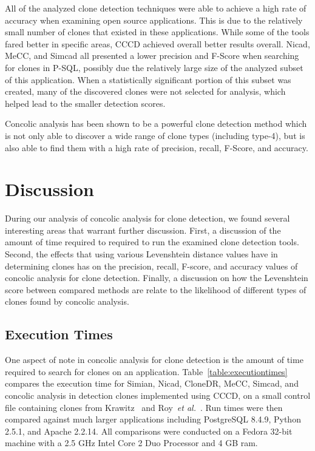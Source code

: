 \documentclass[smallextended]{svjour3}       %
\begin{document}
All of the analyzed clone detection techniques were able to achieve a high rate of accuracy when examining open source applications. This is due to the relatively small number of clones that existed in these applications. While some of the tools fared better in specific areas, CCCD achieved overall better results overall. Nicad, MeCC, and Simcad all presented a lower precision and F-Score when searching for clones in P-SQL, possibly due the relatively large size of the analyzed subset of this application. When a statistically significant portion of this subset was created, many of the discovered clones were not selected for analysis, which helped lead to the smaller detection scores.


Concolic analysis has been shown to be a powerful clone detection method which is not only able to discover a wide range of clone types (including type-4), but is also able to find them with a high rate of precision, recall, F-Score, and accuracy.



\section{Discussion}
\label{sec: discussion}

During our analysis of concolic analysis for clone detection, we found several interesting areas that warrant further discussion. First, a discussion of the amount of time required to required to run the examined clone detection tools. Second, the effects that using various Levenshtein distance values have in determining clones has on the precision, recall, F-score, and accuracy values of concolic analysis for clone detection. Finally, a discussion on how the Levenshtein score between compared methods are relate to the likelihood of different types of clones found by concolic analysis.

\subsection{Execution Times}
One aspect of note in concolic analysis for clone detection is the amount of time required to search for clones on an application. Table~\ref{table:executiontimes} compares the execution time for Simian, Nicad, CloneDR, MeCC, Simcad, and concolic analysis in detection clones implemented using CCCD, on a small control file containing clones from Krawitz~\cite{Kraw2012} and Roy~\emph{et al.}~\cite{Roy:2009:CEC:1530898.1531101}. Run times were then compared against much larger applications including PostgreSQL 8.4.9, Python 2.5.1, and Apache 2.2.14. All comparisons were conducted on a Fedora 32-bit machine with a 2.5 GHz Intel Core 2 Duo Processor and 4 GB ram.
\end{document}
